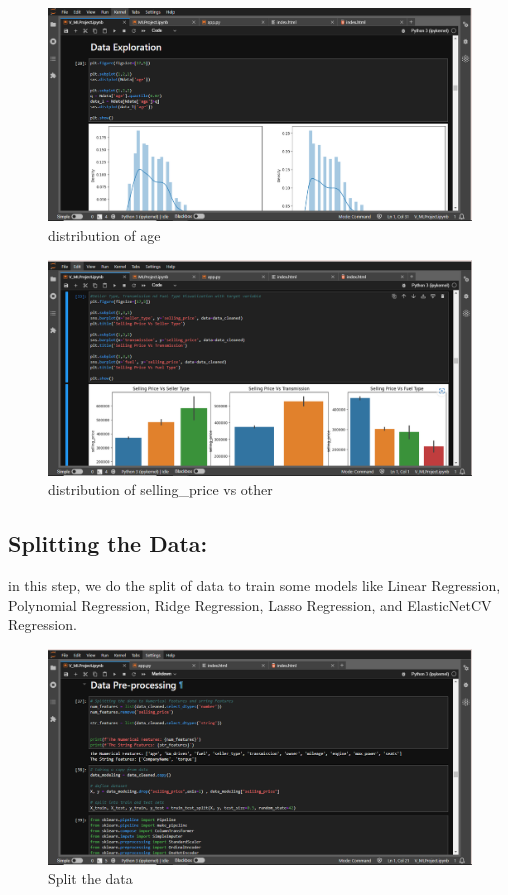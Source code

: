 \documentclass{article}
\begin{document}
\begin{figure}[h]
    \centering
    \includegraphics[width=\textwidth]{plt-age.png}
    \caption{distribution of age}
    \label{fig:left_image}
\end{figure}
\begin{figure}
    \centering
    \includegraphics[width=\textwidth]{plt-price.png}
    \caption{distribution of selling\_price vs other}
    \label{fig:right_image}
\end{figure}
    
\subsection{Splitting the Data:}
in this step, we do the split of data to train some models like Linear Regression, Polynomial Regression, Ridge Regression, Lasso Regression, and ElasticNetCV Regression.\\

\begin{figure}[h]
    \centering
    \includegraphics[width=1\textwidth]{split.png}
    \caption{Split the data}
    \label{fig:my_label}
\end{figure}
\end{document}
